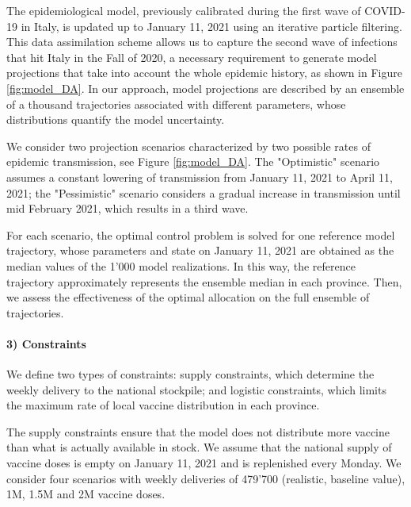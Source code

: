 The epidemiological model, previously calibrated during the first wave of COVID-19 in Italy\cite{Gatto:SpreadDynamicsCOVID19:2020,Bertuzzo:GeographyCOVID19Spread:2020}, is updated up to January 11, 2021 using an iterative particle filtering. This data assimilation scheme allows us to capture the second wave of infections that hit Italy in the Fall of 2020, a necessary requirement to generate model projections that take into account the whole epidemic history, as shown in Figure \ref{fig:model_DA}. In our approach, model projections are described by an ensemble of a thousand trajectories associated with different parameters, whose distributions quantify the model uncertainty. 

We consider two projection scenarios characterized by two possible rates of epidemic transmission, see Figure \ref{fig:model_DA}. The "Optimistic" scenario assumes a constant lowering of transmission from January 11, 2021 to April 11, 2021; the "Pessimistic" scenario considers a gradual increase in transmission until mid February 2021, which results in a third wave. 

For each scenario, the optimal control problem is solved for one reference model trajectory, whose parameters and state on January 11, 2021 are obtained as the median values of the 1'000 model realizations. In this way, the reference trajectory approximately represents the ensemble median in each province. Then, we assess the effectiveness of the optimal allocation on the full ensemble of trajectories.


\paragraph{3) Constraints} We define two types of constraints: supply constraints, which determine the weekly delivery to the national stockpile; and logistic constraints, which limits the maximum rate of local vaccine distribution in each province.

The supply constraints ensure that the model does not distribute more vaccine than what is actually available in stock. We assume that the national supply of vaccine doses is empty on January 11, 2021 and is replenished every Monday. We consider four scenarios with weekly deliveries of 479'700 (realistic, baseline value), 1M, 1.5M and 2M vaccine doses.

